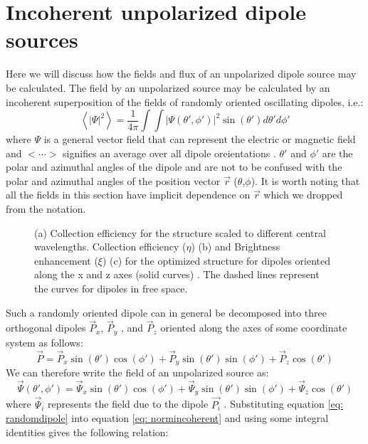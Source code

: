 \documentclass[main.tex]{subfile}
\begin{document}
\section{Incoherent unpolarized dipole sources}
Here we will discuss how the fields and flux of an unpolarized dipole source may be calculated. 
The field by an unpolarized source may be calculated by an incoherent superposition of the fields of randomly oriented oscillating dipoles, i.e.:
\begin{equation}
\label{eq: normincoherent}
\left<|\Psi|^2\right> = \frac{1}{4\pi} \int\int |\Psi(\theta',\phi')|^2 \sin(\theta')d\theta' d\phi' 
\end{equation}
where $\Psi$ is a general vector field that can represent the electric or magnetic field and $<\cdots >$ signifies an average over all dipole oreientations . $\theta'$ and $\phi'$ are the polar and azimuthal angles of the dipole and are not to be confused with the polar and azimuthal angles of the position vector $\vec{r}$ ($\theta$,$\phi$). It is worth noting that all the  fields in this section have implicit dependence on $\vec{r}$ which we dropped from the notation.  
\begin{figure}[t!]
\caption{(a) Collection efficiency for the structure scaled to different central wavelengths. Collection efficiency ($\eta$) (b) and Brightness enhancement ($\xi$)  (c) for the optimized structure for dipoles oriented along the x and z axes (solid curves) . The dashed lines represent the curves for dipoles in free space.} 
\label{fig:Supp2}
\end{figure}
Such a randomly oriented dipole can in general be decomposed into three orthogonal dipoles $\vec{P}_x$, $\vec{P}_y$ , and $\vec{P}_z$ oriented along the axes of some coordinate system as follows: 
\begin{equation}
\vec{P}= \vec{P}_x \sin(\theta')\cos(\phi') + \vec{P}_y \sin(\theta')\sin(\phi')+ \vec{P}_z \cos(\theta') 
\end{equation}
We can therefore write the  field of an unpolarized source as:
\begin{equation}
\label{eq: randomdipole}
\vec{\Psi}(\theta',\phi')= \vec{\Psi}_x\sin(\theta')\cos(\phi')+ \vec{\Psi}_y\sin(\theta')\sin(\phi')+ \vec{\Psi}_z\cos(\theta')
\end{equation}
where $\vec{\Psi}_i$ represents the  field due to the dipole $\vec{P_i}$ .  Substituting equation \ref{eq: randomdipole} into equation \ref{eq: normincoherent} and using some integral identities gives the following relation: 
\end{document}
